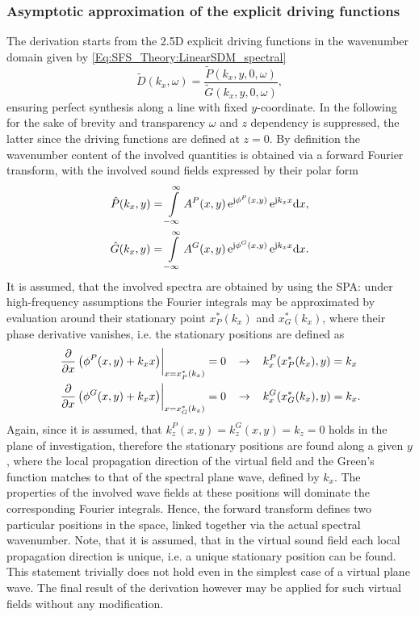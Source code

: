 \subsubsection{Asymptotic approximation of the explicit driving functions}

The derivation starts from the 2.5D explicit driving functions in the wavenumber domain given by \eqref{Eq:SFS_Theory:LinearSDM_spectral}
\begin{equation}
\tilde{D}(k_x,\omega) = \frac{\tilde{P}(k_x,y,0, \omega)}{\tilde{G}(k_x,y,0, \omega)},
\end{equation}
ensuring perfect synthesis along a line with fixed $y$-coordinate.
In the following for the sake of brevity and transparency $\omega$ and $z$ dependency is suppressed, the latter since the driving functions are defined at $z=0$.
By definition the wavenumber content of the involved quantities is obtained via a forward Fourier transform, with the involved sound fields expressed by their polar form
\begin{align} 
\hat{P}(k_x,y) = \int\limits_{-\infty}^{\infty} A^P(x,y) \, \mathrm{e}^{\mathrm{j} \phi^P(x,y)} \, \mathrm{e}^{\mathrm{j} k_x x} \mathrm{d} x, \\
\hat{G}(k_x,y) = \int\limits_{-\infty}^{\infty} A^G(x,y) \, \mathrm{e}^{\mathrm{j} \phi^G(x,y)} \, \mathrm{e}^{\mathrm{j} k_x x} \mathrm{d} x.
\end{align}
It is assumed, that the involved spectra are obtained by using the SPA:
under high-frequency assumptions the Fourier integrals may be approximated by evaluation around their stationary point $x^*_P(k_x)$ and $x^*_G(k_x)$, where their phase derivative vanishes, i.e.
the stationary positions are defined as
\begin{align}
\label{eq:xP_xG_in_spatial_domain}
\left. \frac{\partial}{\partial x} \left(  \phi^P(x,y) + k_x x \right )\right|_{x =x^*_P(k_x)} = 0
\hspace{3mm} &\rightarrow \hspace{3mm}
k_x^P(x^*_P(k_x),y) = k_x \nonumber
\\ 
\left. \frac{\partial}{\partial x} \left(  \phi^G(x,y) + k_x x \right )\right|_{x =x^*_G(k_x)} = 0
\hspace{3mm} &\rightarrow \hspace{3mm}
k_x^G(x^*_G(k_x),y) = k_x.
\end{align}
Again, since it is assumed, that $k_z^P(x,y) = k_z^G(x,y) = k_z = 0$ holds in the plane of investigation, therefore the stationary positions are found along a given $y$, where the local propagation direction of the virtual field and the Green's function matches to that of the spectral plane wave, defined by $k_x$.
The properties of the involved wave fields at these positions will dominate the corresponding Fourier integrals.
Hence, the forward transform defines two particular positions in the space, linked together via the actual spectral wavenumber.
Note, that it is assumed, that in the virtual sound field each local propagation direction is unique, i.e. a unique stationary position can be found.
This statement trivially does not hold even in the simplest case of a virtual plane wave.
The final result of the derivation however may be applied for such virtual fields without any modification.

